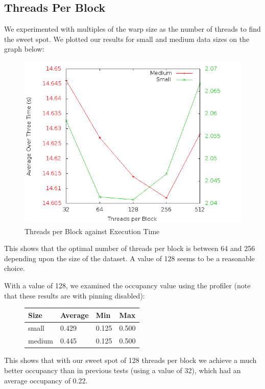 \subsection{Threads Per Block}
We experimented with multiples of the warp size as the number of threads to find the sweet spot. We plotted our results for small and medium data sizes on the graph below:

\begin{figure}[H]
  \centering
  \includegraphics[scale=0.3]{images/threadsperblock}
  \caption[threadsperblock]{Threads per Block against Execution Time}
  \label{fig:threadsperblock}
\end{figure}

This shows that the optimal number of threads per block is between 64 and 256 depending upon the size of the dataset. A value of 128 seems to be a reasonable choice.

With a value of 128, we examined the occupancy value using the profiler (note that these results are with pinning disabled):

\begin{figure}[H]\centering \begin{tabular}{ l | l | l | l}
\hline
Size & Average & Min & Max \\
\hline
\hline
small & 0.429 & 0.125 & 0.500 \\
medium & 0.445 & 0.125 & 0.500 \\
\hline
\end{tabular} \end{figure}

This shows that with our sweet spot of 128 threads per block we achieve a much better occupancy than in previous tests (using a value of 32), which had an average occupancy of 0.22.
